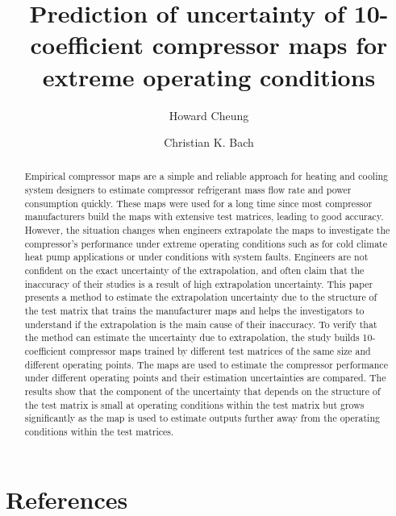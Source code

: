 \documentclass[a4paper]{jpconf}
\begin{document}
\title{Prediction of uncertainty of 10-coefficient compressor maps for extreme operating conditions}

\author{Howard Cheung}

\address{Postdoctoral Research Fellow, Ray W. Herrick Laboratories, School of Mechanical Engineering, Purdue University, 177 S. Russell St., West Lafayette, IN 47907-2031, US}


\author{Christian K. Bach}

\address{Assistant Professor, Mechanical and Aerospace Engineering, Oklahoma State University, 218 Engineering North, Stillwater, OK 74078-5016}


\begin{abstract}
Empirical compressor maps are a simple and reliable approach for heating and cooling system designers to estimate compressor refrigerant mass flow rate and power consumption quickly. These maps were used for a long time since most compressor manufacturers build the maps with extensive test matrices, leading to good accuracy. However, the situation changes when engineers extrapolate the maps to investigate the compressor's performance under extreme operating conditions such as for cold climate heat pump applications or under conditions with system faults.  Engineers are not confident on the exact uncertainty of the extrapolation, and often claim that the inaccuracy of their studies is a result of high extrapolation uncertainty. This paper presents a method to estimate the extrapolation uncertainty due to the structure of the test matrix that trains the manufacturer maps and helps the investigators to understand if the extrapolation is the main cause of their inaccuracy. To verify that the method can estimate the uncertainty due to extrapolation, the study builds 10-coefficient compressor maps trained by different test matrices of the same size and different operating points. The maps are used to estimate the compressor performance under different operating points and their estimation uncertainties are compared. The results show that the component of the uncertainty that depends on the structure of the test matrix is small at operating conditions within the test matrix but grows significantly as the map is used to estimate outputs further away from the operating conditions within the test matrices.
\end{abstract}





















\section*{References}


%
\end{document}

